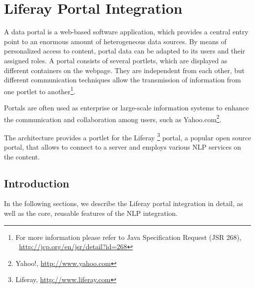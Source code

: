 %
%
%   
% 

\chapter{Liferay Portal Integration}
\label{chap:liferay}
A data portal is a web-based software application, which provides a central entry point to an enormous amount of heterogeneous data sources. By means of personalized access to content, portal data can be adapted to its users and their assigned roles. A portal consists of several portlets, which are displayed as different containers on the webpage. They are independent from each other, but different communication techniques allow the transmission of information from one portlet to another\footnote{For more information please refer to Java Specification Request (JSR 268), ~\url{http://jcp.org/en/jsr/detail?id=268}}.

Portals are often used as enterprise or large-scale information systems to enhance the communication and collaboration among users, such as Yahoo.com\footnote{Yahoo!, \url{http://www.yahoo.com}}. 

The \sa architecture provides a portlet for the Liferay \footnote{Liferay, \url{http://www.liferay.com}} portal, a popular open source portal, that allows to connect to a \sa server and employs various NLP services on the content.

\section{Introduction}
In the following sections, we describe the Liferay portal integration in detail, as well as the core, reusable features of the NLP integration.

